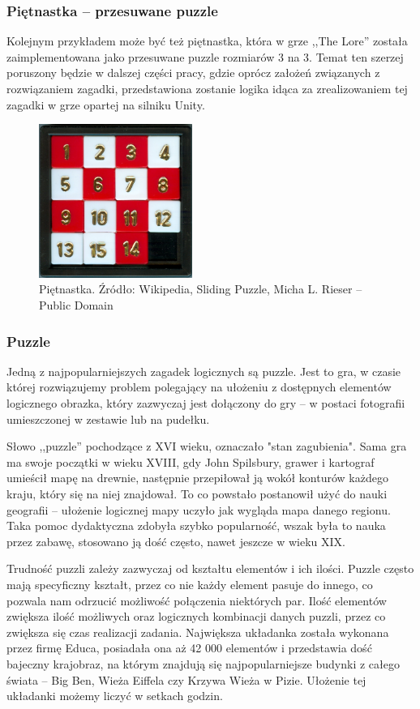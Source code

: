 \documentclass[oneside,polski,logo]{amuthesis}
\begin{document}
\subsubsection{Piętnastka – przesuwane puzzle}
\par Kolejnym przykładem może być też piętnastka, która w grze ,,The Lore'' została zaimplementowana jako przesuwane puzzle rozmiarów 3 na 3. Temat ten szerzej poruszony będzie w dalszej części pracy, gdzie oprócz założeń związanych z rozwiązaniem zagadki, przedstawiona zostanie logika idąca za zrealizowaniem tej zagadki w grze opartej na silniku Unity. 
\begin{figure}[h]
	\centering
	\includegraphics[width=5cm]{images/tyrek/przesuwane-puzzle.jpg}
	\caption{Piętnastka. Źródło: Wikipedia, Sliding Puzzle, Micha L. Rieser – Public Domain}
\end{figure}

\subsubsection{Puzzle}
\par Jedną z najpopularniejszych zagadek logicznych są puzzle. Jest to gra, w czasie której rozwiązujemy problem polegający na ułożeniu z dostępnych elementów logicznego obrazka, który zazwyczaj jest dołączony do gry – w postaci fotografii umieszczonej w zestawie lub na pudełku.
 
Słowo ,,puzzle'' pochodzące z XVI wieku, oznaczało "stan zagubienia". Sama gra ma swoje początki w wieku XVIII, gdy John Spilsbury, grawer i kartograf umieścił mapę na drewnie, następnie przepiłował ją wokół konturów każdego kraju, który się na niej znajdował. To co powstało postanowił użyć do nauki geografii – ułożenie logicznej mapy uczyło jak wygląda mapa danego regionu. Taka pomoc dydaktyczna zdobyła szybko popularność, wszak była to nauka przez zabawę, stosowano ją dość często, nawet jeszcze w wieku XIX.  

Trudność puzzli zależy zazwyczaj od kształtu elementów i ich ilości. Puzzle często mają specyficzny kształt, przez co nie każdy element pasuje do innego, co pozwala nam odrzucić możliwość połączenia niektórych par. Ilość elementów zwiększa ilość możliwych oraz logicznych kombinacji danych puzzli, przez co zwiększa się czas realizacji zadania. Największa układanka została wykonana przez firmę Educa, posiadała ona aż 42 000 elementów i przedstawia dość bajeczny krajobraz, na którym znajdują się najpopularniejsze budynki z całego świata – Big Ben, Wieża Eiffela czy Krzywa Wieża w Pizie. Ułożenie tej układanki możemy liczyć w setkach godzin. \cite{puzzle}
\end{document}
